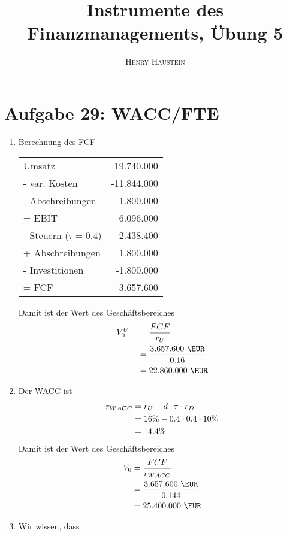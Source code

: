 \documentclass{article}
\title{\textbf{Instrumente des Finanzmanagements, Übung 5}}
\author{\textsc{Henry Haustein}}
\date{}
\begin{document}
	\maketitle

	\section*{Aufgabe 29: WACC/FTE}
	\begin{enumerate}[label=(\alph*)]
		\item Berechnung des FCF
		\begin{center}
			\begin{tabular}{l|r}
				Umsatz & 19.740.000 \EUR \\
				- var. Kosten & -11.844.000 \EUR \\
				- Abschreibungen & -1.800.000 \EUR \\
				\hline
				= EBIT & 6.096.000 \EUR \\
				- Steuern ($\tau=0.4$) & -2.438.400 \EUR \\
				+ Abschreibungen & 1.800.000 \EUR \\
				- Investitionen & -1.800.000 \EUR \\
				\hline
				= FCF & 3.657.600 \EUR
			\end{tabular}
		\end{center}
		Damit ist der Wert des Geschäftsbereiches
		\begin{align}
			V_0^U = &= \frac{FCF}{r_U} \notag \\
			&= \frac{3.657.600\text{ \EUR}}{0.16} \notag \\
			&= 22.860.000 \text{ \EUR} \notag
		\end{align}
		\item Der WACC ist
		\begin{align}
			r_{WACC} &= r_U - d\cdot\tau\cdot r_D \notag \\
			&= 16\% - 0.4\cdot 0.4\cdot 10\% \notag \\
			&= 14.4 \% \notag
		\end{align}
		Damit ist der Wert des Geschäftsbereiches
		\begin{align}
			V_0 &= \frac{FCF}{r_{WACC}} \notag \\
			&= \frac{3.657.600 \text{ \EUR}}{0.144} \notag \\
			&= 25.400.000 \text{ \EUR} \notag
		\end{align}
		\item Wir wissen, dass
		\begin{align}

\end{align}
\end{enumerate}
\end{document}
